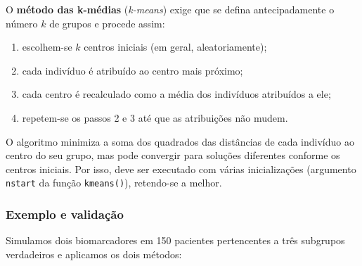 \documentclass[
]{book}
\providecommand{\tightlist}{%
  \setlength{\itemsep}{0pt}\setlength{\parskip}{0pt}}
\begin{document}
O \textbf{método das k-médias} (\emph{k-means}) exige que se defina antecipadamente o número \(k\) de grupos e procede assim:

\begin{enumerate}
\def\labelenumi{\arabic{enumi}.}
\tightlist
\item
  escolhem-se \(k\) centros iniciais (em geral, aleatoriamente);
\item
  cada indivíduo é atribuído ao centro mais próximo;
\item
  cada centro é recalculado como a média dos indivíduos atribuídos a ele;
\item
  repetem-se os passos 2 e 3 até que as atribuições não mudem.
\end{enumerate}

O algoritmo minimiza a soma dos quadrados das distâncias de cada indivíduo ao centro do seu grupo, mas pode convergir para soluções diferentes conforme os centros iniciais. Por isso, deve ser executado com várias inicializações (argumento \texttt{nstart} da função \texttt{kmeans()}), retendo-se a melhor.

\subsubsection{Exemplo e validação}\label{exemplo-e-validauxe7uxe3o}

Simulamos dois biomarcadores em 150 pacientes pertencentes a três subgrupos verdadeiros e aplicamos os dois métodos:
\end{document}
